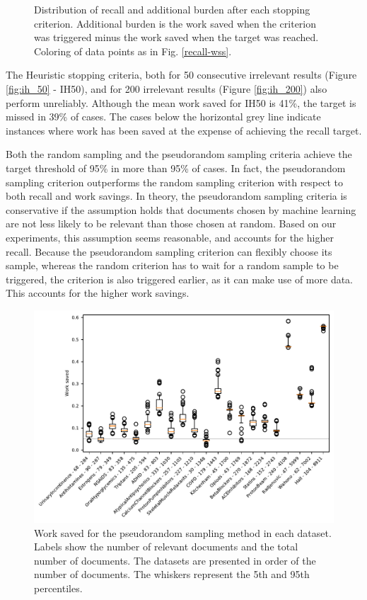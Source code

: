 \documentclass{bmcart}
\begin{document}
\begin{figure}
	\caption{\small Distribution of recall and additional burden after each stopping criterion. Additional burden is the work saved when the criterion was triggered minus the work saved when the target was reached. Coloring of data points as in Fig. \ref{recall-wss}.}
	\label{recall-burden}
\end{figure}


	The Heuristic stopping criteria, both for 50 consecutive irrelevant results (Figure \ref{fig:ih_50} - IH50), and for 200 irrelevant results (Figure \ref{fig:ih_200}) also perform unreliably. Although the mean work saved for IH50 is 41\%, the target is missed in 39\% of cases. The cases below the horizontal grey line indicate instances where work has been saved at the expense of achieving the recall target.
	
	Both the random sampling and the pseudorandom sampling criteria achieve the target threshold of 95\% in more than 95\% of cases. In fact, the pseudorandom sampling criterion  outperforms the random sampling criterion with respect to both recall and work savings. In theory, the pseudorandom sampling criteria is conservative if the assumption holds that documents chosen by machine learning are not less likely to be relevant than those chosen at random. Based on our experiments, this assumption seems reasonable, and accounts for the higher recall. Because the pseudorandom sampling criterion can flexibly choose its sample, whereas the random criterion has to wait for a random sample to be triggered, the criterion is also triggered earlier, as it can make use of more data. This accounts for the higher work savings.
	
	\begin{figure}
		\includegraphics[width=0.9\linewidth]{../images/wss_nrs}
		\caption{Work saved for the pseudorandom sampling method in each dataset. Labels show the number of relevant documents and the total number of documents. The datasets are presented in order of the number of documents. The whiskers represent the 5th and 95th percentiles.}
		\label{wss}
	\end{figure}
	
\end{document}
